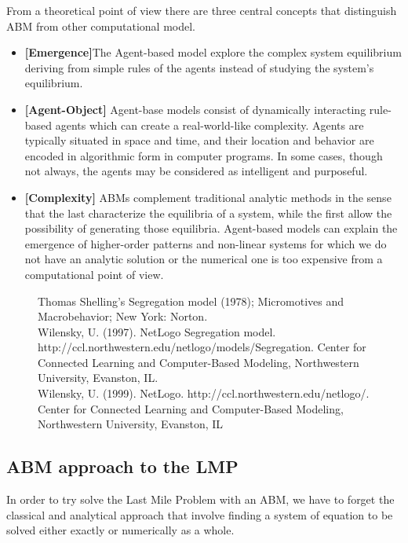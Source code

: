 \documentclass[11pt,a4paper]{article}
\begin{document}
From a theoretical point of view there are three central concepts that distinguish ABM from other computational model. 
\begin{itemize}
\item \textbf{[Emergence]}The Agent-based model explore the complex system equilibrium deriving from simple rules of the agents instead of studying the system's equilibrium.
\item \textbf{[Agent-Object]} Agent-base models consist of dynamically interacting rule-based agents which can create a real-world-like complexity. 
Agents are typically situated in space and time, and their location and behavior are encoded in algorithmic form in computer programs. 
In some cases, though not always, the agents may be considered as intelligent and purposeful.
\item \textbf{[Complexity]} ABMs complement traditional analytic methods in the sense that the last characterize the equilibria of a system, while the first  allow the possibility of generating those equilibria. 
Agent-based models can explain the emergence of higher-order patterns and non-linear systems for which we do not have an analytic solution or the numerical one is too expensive from a computational point of view.
\end{itemize}

\newpage
\begin{figure}[h!]
\centering
\caption{Thomas Shelling's Segregation model (1978); Micromotives and Macrobehavior; New York: Norton. \\
Wilensky, U. (1997). NetLogo Segregation model. http://ccl.northwestern.edu/netlogo/models/Segregation. Center for Connected Learning and Computer-Based Modeling, Northwestern University, Evanston, IL.\\
Wilensky, U. (1999). NetLogo. http://ccl.northwestern.edu/netlogo/. Center for Connected Learning and Computer-Based Modeling, Northwestern University, Evanston, IL}
\end{figure}
 
\subsection{ABM approach to the LMP}
In order to try solve the Last Mile Problem with an ABM, we have to forget the classical and analytical approach that involve finding a system of equation to be solved either exactly or numerically as a whole.
\end{document}
